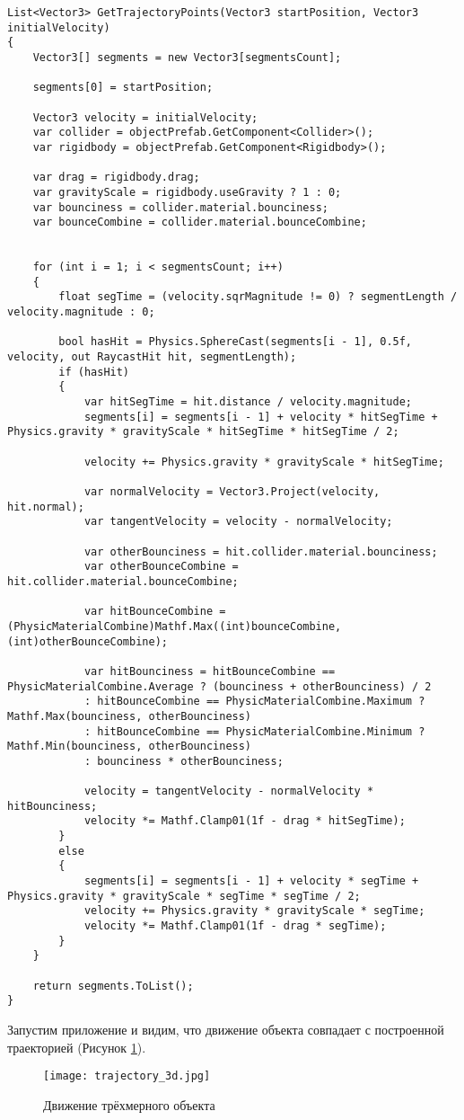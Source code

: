 \begin{lstlisting}[style=fsharpstyle, caption={Построение траектории трёхмерного движущегося объекта}, label=listing.trajectory_3d]
List<Vector3> GetTrajectoryPoints(Vector3 startPosition, Vector3 initialVelocity)
{
	Vector3[] segments = new Vector3[segmentsCount];
	
	segments[0] = startPosition;
	
	Vector3 velocity = initialVelocity;
	var collider = objectPrefab.GetComponent<Collider>();
	var rigidbody = objectPrefab.GetComponent<Rigidbody>();
	
	var drag = rigidbody.drag;
	var gravityScale = rigidbody.useGravity ? 1 : 0;
	var bounciness = collider.material.bounciness;
	var bounceCombine = collider.material.bounceCombine;
	
	
	for (int i = 1; i < segmentsCount; i++)
	{
		float segTime = (velocity.sqrMagnitude != 0) ? segmentLength / velocity.magnitude : 0;
		
		bool hasHit = Physics.SphereCast(segments[i - 1], 0.5f, velocity, out RaycastHit hit, segmentLength);
		if (hasHit)
		{
			var hitSegTime = hit.distance / velocity.magnitude;
			segments[i] = segments[i - 1] + velocity * hitSegTime + Physics.gravity * gravityScale * hitSegTime * hitSegTime / 2;
			
			velocity += Physics.gravity * gravityScale * hitSegTime;
			
			var normalVelocity = Vector3.Project(velocity, hit.normal);
			var tangentVelocity = velocity - normalVelocity;
			
			var otherBounciness = hit.collider.material.bounciness;
			var otherBounceCombine = hit.collider.material.bounceCombine;
			
			var hitBounceCombine = (PhysicMaterialCombine)Mathf.Max((int)bounceCombine, (int)otherBounceCombine);
			
			var hitBounciness = hitBounceCombine == PhysicMaterialCombine.Average ? (bounciness + otherBounciness) / 2
			: hitBounceCombine == PhysicMaterialCombine.Maximum ? Mathf.Max(bounciness, otherBounciness)
			: hitBounceCombine == PhysicMaterialCombine.Minimum ? Mathf.Min(bounciness, otherBounciness)
			: bounciness * otherBounciness;
			
			velocity = tangentVelocity - normalVelocity * hitBounciness;
			velocity *= Mathf.Clamp01(1f - drag * hitSegTime);
		}
		else
		{
			segments[i] = segments[i - 1] + velocity * segTime + Physics.gravity * gravityScale * segTime * segTime / 2;
			velocity += Physics.gravity * gravityScale * segTime;
			velocity *= Mathf.Clamp01(1f - drag * segTime);
		}
	}
	
	return segments.ToList();
}
\end{lstlisting}

Запустим приложение и видим, что движение объекта совпадает с построенной траекторией (Рисунок \ref{picture.trajectory_3d}).

\begin{figure}[h]
	\noindent\centering
	\texttt{[image: trajectory\_3d.jpg]}  
	\caption{Движение трёхмерного объекта}
	\label{picture.trajectory_3d}
\end{figure}




